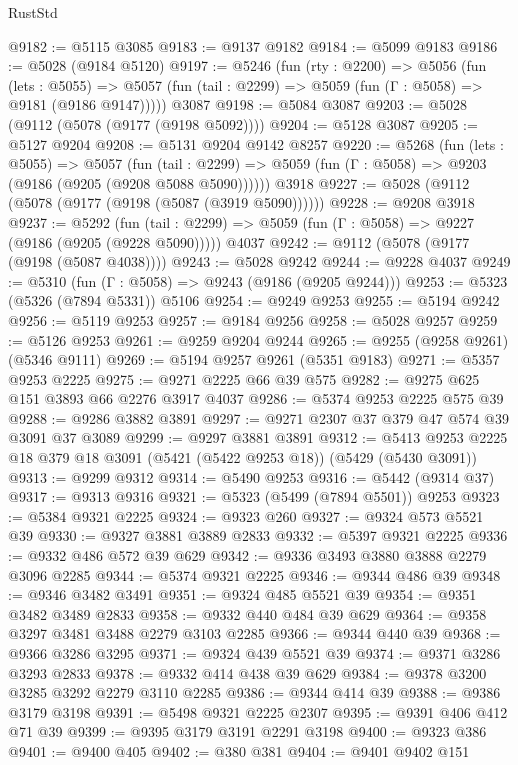 \begin{lexlean}{RustStd}
\begin{coremodule}
{\begin{coremodule}
{{{{{{{{{{{{@9182 := @5115 @3085
@9183 := @9137 @9182
@9184 := @5099 @9183
@9186 := @5028 (@9184 @5120)
@9197 := @5246
    (fun (rty : @2200) =>
    @5056
      (fun (lets : @5055) =>
      @5057 (fun (tail : @2299) => @5059 (fun (Γ : @5058) => @9181 (@9186 @9147)))))
    @3087
@9198 := @5084 @3087
@9203 := @5028 (@9112 (@5078 (@9177 (@9198 @5092))))
@9204 := @5128 @3087
@9205 := @5127 @9204
@9208 := @5131 @9204 @9142 @8257
@9220 := @5268
    (fun (lets : @5055) =>
    @5057
      (fun (tail : @2299) => @5059 (fun (Γ : @5058) => @9203 (@9186 (@9205 (@9208 @5088 @5090))))))
    @3918
@9227 := @5028 (@9112 (@5078 (@9177 (@9198 (@5087 (@3919 @5090))))))
@9228 := @9208 @3918
@9237 := @5292
    (fun (tail : @2299) => @5059 (fun (Γ : @5058) => @9227 (@9186 (@9205 (@9228 @5090)))))
    @4037
@9242 := @9112 (@5078 (@9177 (@9198 (@5087 @4038))))
@9243 := @5028 @9242
@9244 := @9228 @4037
@9249 := @5310 (fun (Γ : @5058) => @9243 (@9186 (@9205 @9244)))
@9253 := @5323 (@5326 (@7894 @5331)) @5106
@9254 := @9249 @9253
@9255 := @5194 @9242
@9256 := @5119 @9253
@9257 := @9184 @9256
@9258 := @5028 @9257
@9259 := @5126 @9253
@9261 := @9259 @9204 @9244
@9265 := @9255 (@9258 @9261) (@5346 @9111)
@9269 := @5194 @9257 @9261 (@5351 @9183)
@9271 := @5357 @9253 @2225
@9275 := @9271 @2225 @66 @39 @575
@9282 := @9275 @625 @151 @3893 @66 @2276 @3917 @4037
@9286 := @5374 @9253 @2225 @575 @39
@9288 := @9286 @3882 @3891
@9297 := @9271 @2307 @37 @379 @47 @574 @39 @3091 @37 @3089
@9299 := @9297 @3881 @3891
@9312 := @5413 @9253 @2225 @18 @379 @18 @3091 (@5421 (@5422 @9253 @18)) (@5429 (@5430 @3091))
@9313 := @9299 @9312
@9314 := @5490 @9253
@9316 := @5442 (@9314 @37)
@9317 := @9313 @9316
@9321 := @5323 (@5499 (@7894 @5501)) @9253
@9323 := @5384 @9321 @2225
@9324 := @9323 @260
@9327 := @9324 @573 @5521 @39
@9330 := @9327 @3881 @3889 @2833
@9332 := @5397 @9321 @2225
@9336 := @9332 @486 @572 @39 @629
@9342 := @9336 @3493 @3880 @3888 @2279 @3096 @2285
@9344 := @5374 @9321 @2225
@9346 := @9344 @486 @39
@9348 := @9346 @3482 @3491
@9351 := @9324 @485 @5521 @39
@9354 := @9351 @3482 @3489 @2833
@9358 := @9332 @440 @484 @39 @629
@9364 := @9358 @3297 @3481 @3488 @2279 @3103 @2285
@9366 := @9344 @440 @39
@9368 := @9366 @3286 @3295
@9371 := @9324 @439 @5521 @39
@9374 := @9371 @3286 @3293 @2833
@9378 := @9332 @414 @438 @39 @629
@9384 := @9378 @3200 @3285 @3292 @2279 @3110 @2285
@9386 := @9344 @414 @39
@9388 := @9386 @3179 @3198
@9391 := @5498 @9321 @2225 @2307
@9395 := @9391 @406 @412 @71 @39
@9399 := @9395 @3179 @3191 @2291 @3198
@9400 := @9323 @386
@9401 := @9400 @405
@9402 := @380 @381
@9404 := @9401 @9402 @151
}}}}}}}}}}}}
\end{coremodule}}
\end{coremodule}
\end{lexlean}
